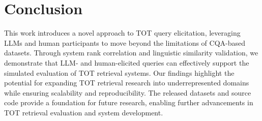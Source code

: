 \section{Conclusion}\label{sec:conclusion}
This work introduces a novel approach to TOT query elicitation, leveraging LLMs and human participants to move beyond the limitations of CQA-based datasets. Through system rank correlation and linguistic similarity validation, we demonstrate that LLM- and human-elicited queries can effectively support the simulated evaluation of TOT retrieval systems. Our findings highlight the potential for expanding TOT retrieval research into underrepresented domains while ensuring scalability and reproducibility. The released datasets and source code provide a foundation for future research, enabling further advancements in TOT retrieval evaluation and system development.